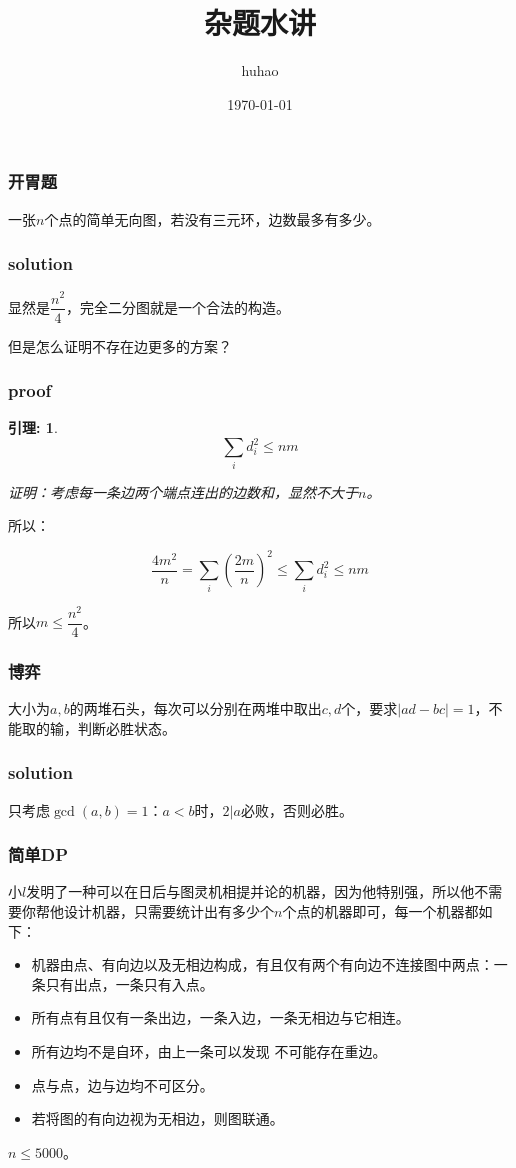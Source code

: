 \documentclass[10pt]{beamer}
\begin{document}
	\title{杂题水讲}
	\date{\today}
	\author{huhao}
	\maketitle
	\begin{frame}
		\frametitle{开胃题}

		一张$n$个点的简单无向图，若没有三元环，边数最多有多少。
	\end{frame}
	\begin{frame}
		\frametitle{solution}
	
		显然是$\dfrac {n^2}4$，完全二分图就是一个合法的构造。

		但是怎么证明不存在边更多的方案？
	
	\end{frame}
	\begin{frame}
		\frametitle{proof}
	
		\newtheorem{lemma1}{引理:}[section]
		\begin{lemma1}
			$$
			\sum_{i} d_i^2\le nm
			$$

			证明：考虑每一条边两个端点连出的边数和，显然不大于$n$。
		\end{lemma1}

		所以：

		$$
		\dfrac{4m^2}{n}=\sum_i (\dfrac{2m}n)^2\le \sum_id_i^2\le nm
		$$

		所以$m\le \dfrac{n^2}{4}$。
	\end{frame}
	\begin{frame}
		\frametitle{博弈}
	
		大小为$a,b$的两堆石头，每次可以分别在两堆中取出$c,d$个，要求$|ad-bc|=1$，不能取的输，判断必胜状态。
	
	\end{frame}
	\begin{frame}
		\frametitle{solution}
	
		只考虑$\gcd(a,b)=1$：$a<b$时，$2|a$必败，否则必胜。
	
	\end{frame}
	\begin{frame}
		\frametitle{简单DP}
	
		
		小$l$发明了一种可以在日后与图灵机相提并论的机器，因为他特别强，所以他不需要你帮他设计机器，只需要统计出有多少个$n$个点的机器即可，每一个机器都如下：
		\begin{itemize}
		\item 机器由点、有向边以及无相边构成，有且仅有两个有向边不连接图中两点：一条只有出点，一条只有入点。
		\item 所有点有且仅有一条出边，一条入边，一条无相边与它相连。
		\item 所有边均不是自环，由上一条可以发现 不可能存在重边。
		\item 点与点，边与边均不可区分。
		\item 若将图的有向边视为无相边，则图联通。
		\end{itemize}

		$n\le 5000$。
	
	\end{frame}
\end{document}
